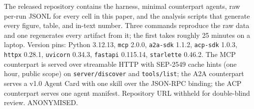 \documentclass{article}
\newcommand{\code}[1]{\mbox{\texttt{#1}}}
\begin{document}
The released repository contains the harness, minimal counterpart agents,
raw per-run JSONL for every cell in this paper, and the analysis scripts
that generate every figure, table, and in-text number. Three commands
reproduce the raw data and one regenerates every artifact from it; the
first takes roughly 25 minutes on a laptop. Version pins: Python 3.12.13,
\code{mcp} 2.0.0, \code{a2a-sdk} 1.1.2, \code{acp-sdk} 1.0.3, \code{httpx}
0.28.1, \code{uvicorn} 0.34.3, \code{fastapi} 0.115.14, \code{starlette}
0.46.2. The MCP counterpart is served over streamable HTTP with SEP-2549
cache hints (one hour, public scope) on \code{server/discover} and
\code{tools/list}; the A2A counterpart serves a v1.0 Agent Card with one
skill over the JSON-RPC binding; the ACP counterpart serves one agent
manifest. Repository URL withheld for double-blind review. ANONYMISED.
\end{document}
